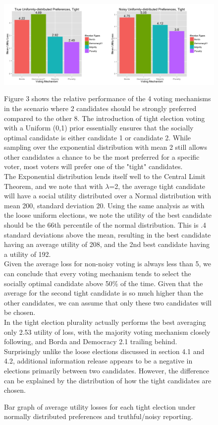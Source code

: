 \documentclass[11pt]{scrartcl}
\begin{document}
\begin{figure}[H]\center
\includegraphics[scale=0.38]{uniform_tight_noisy.png}
\caption{Bar graph of average utility losses for each tight election under normally distributed preferences and truthful/noisy reporting.}


Figure 3 shows the relative performance of the 4 voting mechanisms in the scenario where 2 candidates should be strongly preferred compared to the other 8. The introduction of tight election voting with a Uniform (0,1) prior essentially ensures that the socially optimal candidate is either candidate 1 or candidate 2. While sampling over the exponential distribution with mean 2 still allows other candidates a chance to be the most preferred for a specific voter, most voters will prefer one of the "tight" candidates.\\

The Exponential distribution lends itself well to the Central Limit Theorem, and we note that with $\lambda$=2, the average tight candidate will have a social utility distributed over a Normal distribution with mean 200, standard deviation 20. Using the same analysis as with the loose uniform elections, we note the utility of the best candidate should be the $66$th percentile of the normal distribution. This is .4 standard deviations above the mean, resulting in the best candidate having an average utility of 208, and the 2nd best candidate having a utility of 192.\\

Given the average loss for non-noisy voting is always less than 5, we can conclude that every voting mechanism tends to select the socially optimal candidate above 50\% of the time. Given that the average for the second tight candidate is so much higher than the other candidates, we can assume that only these two candidates will be chosen.\\

In the tight election plurality actually performs the best averaging only 2.53 utility of loss, with the majority voting mechanism closely following, and Borda and Democracy 2.1 trailing behind. Surprisingly unlike the loose elections discussed in section 4.1 and 4.2, additional information release appears to be a negative in elections primarily between two candidates. However, the difference can be explained by the distribution of how the tight candidates are chosen.\\


\end{figure}
\end{document}
